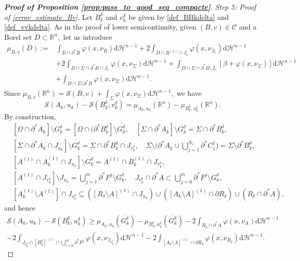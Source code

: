 \documentclass[reqno]{amsart}
\numberwithin{equation}{section}
\theoremstyle{plain}
\theoremstyle{definition}
\newcommand{\R}{\mathbb{R}}
\newcommand{\cH}{\mathcal{H}}
\newcommand{\cS}{\mathcal{S}}
\newcommand{\p}{\partial}
\newcommand{\cl}[1]{\overline{#1}}
\renewcommand{\d}{\mathrm{d}}
\newcommand{\admissible}{\mathcal{C}}
\begin{document}
\begin{proof}[\textbf{Proof of Proposition \ref{prop:pass_to_good_seq_compacte}}]
{\it Step 5: Proof of \eqref{error_estimate_Bv}.} Let $B_k^\delta$ and $v_k^\delta$ be given by \eqref{def_BBkdelta} and \eqref{def_vvkdelta}.
%
As in the proof of lower semicontinuity, given $(B,v)\in\admissible$ and a Borel set $D\subset\R^n,$ let us introduce
\begin{align*}
\mu_{B,v}(D) := & \int_{D\cap \p^*B}\varphi(x,\nu_{B})\d\cH^{n-1} + 2\int_{D\cap B^{(1)}\cap J_v} \varphi(x,\nu_{J_v})\d\cH^{n-1}\\
&+ 2 \int_{D\cap \Sigma\cap \p^*B\cap J_v} \varphi(x,\nu_{\Sigma})\d\cH^{n-1} + 
\int_{D\cap \Sigma\cap \p^*B\setminus J_v} [\beta + \varphi(x,\nu_{\Sigma})]\d\cH^{n-1}\\
& + \int_{D\cap \Sigma\setminus \p^*B} \varphi(x,\nu_{\Sigma})\d\cH^{n-1}.
\end{align*}
%
Since
$
\mu_{B,v}(\R^n) = \cS(B,v) + \int_{\Sigma}\varphi(x,\nu_\Sigma)\d\cH^{n-1}, 
$
we have
$$
\cS(A_k,u_k) - \cS(B_k^\delta,v_k^\delta) = 
\mu_{A_k,u_k}(\R^n) - \mu_{B_k^\delta,u_k^\delta}(\R^n).
$$
By construction,
\begin{align*}
& [\Omega\cap \p^*A_k] \setminus \cl{G_k^\delta} = [\Omega\cap (\p^*B_k^\delta] \setminus \cl{G_k^\delta},\quad
%
[\Sigma \cap \p^*A_k] \setminus \cl{G_k^\delta} = \Sigma \cap \p^*B_k^\delta,\\
%
& [\Sigma\cap \p^*A_k \cap J_{u_k}]\setminus \cl{G_k^\delta} = \Sigma\cap \p^*B_k^\delta \cap J_{v_k^\delta},
\quad
%
\Sigma\setminus \Big(\p^*A_k\cup \bigcup_{j=1}^{N_1} \p^*C_1^j) = \Sigma\setminus \p^*B_k^\delta,\\
%
& [A^{(1)}\cap A_k^{(1)}\cap J_{u_k} ]\setminus \cl{G_k^\delta} =  A^{(1)}\cap B_k^{(1)}\cap J_{v_k^\delta},\\
%
& [A^{(1)}\cap J_{v_k^\delta}]\setminus J_{u_k} = \bigcup_{j=1}^m \p^*F^j \setminus G_k^\delta,
\quad 
J_{v_k^\delta}\cap \p^*A\subset \bigcup_{j=0}^m \p^*F^j \setminus G_k^\delta,\\
& [A_k^{(1)}\setminus A^{(1)}]\cap J_{v_k^\delta} 
\subseteq ([R_\delta\setminus A]^{(1)}\cap J_{u_k}) \cup ([A_k \setminus A]^{(1)}\cap \p R_\delta)\cup (R_\delta \cap\p^*A),
\end{align*}
and hence
\begin{multline}\label{juhuggza}
\cS(A_k,u_k) - \cS(B_k^\delta,u_k^\delta) \ge
\mu_{A_k,u_k}(\cl{G_k^\delta}) - \mu_{B_k^\delta,u_k^\delta}(\cl{G_k^\delta})  
- 2\int_{R_\delta\cap \p^*A} \varphi(x,\nu_A)\d\cH^{n-1} \\
- 2
\int_{J_{v_k^\delta}\cap [B_k^\delta]^{(1)}\cap \bigcup_{i=0}^m\p^*F^j} \varphi(x,\nu_{J_{v_k^\delta}})\d\cH^{n-1} - 2 \int_{[A_k\setminus A]^{(1)}\cap \p R_\delta} \varphi(x,\nu_{R_\delta})\d \cH^{n-1}.

\end{multline}
\end{proof}
\end{document}
